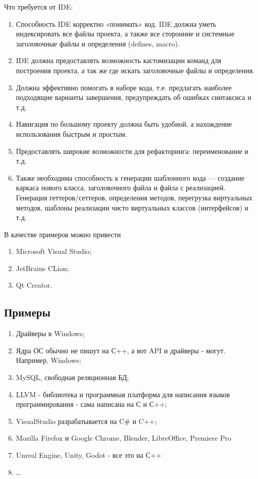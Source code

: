Что требуется от IDE:
\begin{enumerate}
  \item Способность IDE корректно «понимать» код. IDE
  должна уметь индексировать все файлы проекта, а также все сторонние и
  системные заголовочные файлы и определения (defines, macro).
  \item IDE
  должна предоставлять возможность кастомизации команд для построения
  проекта, а так же где искать заголовочные файлы и определения.
  \item Должна
  эффективно помогать в наборе кода, т.е. предлагать наиболее подходящие
  варианты завершения, предупреждать об ошибках синтаксиса и т.д.
  \item Навигация по большому проекту должна быть удобной, а нахождение
  использования быстрым и простым.
  \item Предоставлять широкие возможности для
  рефакторинга: переименование и т.д.
  \item Также необходима способность к
  генерации шаблонного кода --- создание каркаса нового класса,
  заголовочного файла и файла с реализацией. Генерация геттеров/сеттеров,
  определения методов, перегрузка виртуальных методов, шаблоны реализации
  чисто виртуальных классов (интерфейсов) и т.д.
\end{enumerate}

В качестве примеров можно привести
\begin{enumerate}
  \item Microsoft Visual Studio;
  \item JetBrains CLion;
  \item Qt Creator.
\end{enumerate}

\subsection*{Примеры}\label{examples_3}

\begin{enumerate}
\item
  Драйверы в Windows;
\item
  Ядра ОС обычно не пишут на С++, а вот API и драйверы - могут.
  Например, Windows;
\item
  MySQL, свободная реляционная БД;
\item
  LLVM - библиотека и программная платформа для написания языков
  программирования - сама написана на С и С++;
\item
  VisualStudio разрабатывается на C\# и C++;
\item
  Mozilla Firefox и Google Chrome, Blender, LibreOffice, Premiere Pro
\item
  Unreal Engine, Unity, Godot - все это на С++
\item
  \ldots{}
\end{enumerate}

